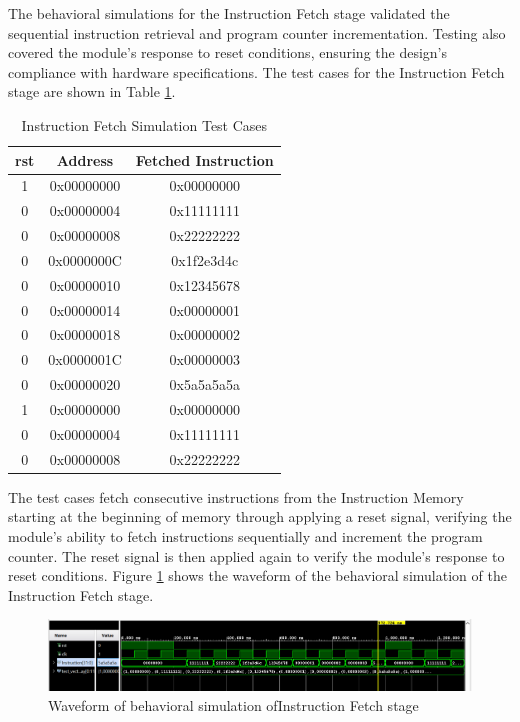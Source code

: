 \documentclass[CMPE]{../KGCOEReport}
\begin{document}
The behavioral simulations for the Instruction Fetch stage validated the sequential instruction retrieval and program counter incrementation. Testing also covered the module's response to reset conditions, ensuring the design's compliance with hardware specifications. The test cases for the Instruction Fetch stage are shown in Table \ref{tab:fetch_test_cases}.

\begin{table}[H]
\centering
\begin{tabular}{|c|c|c|}
\hline
\textbf{rst} & \textbf{Address} & \textbf{Fetched Instruction} \\
\hline
1 & 0x00000000 & 0x00000000 \\
0 & 0x00000004 & 0x11111111 \\
0 & 0x00000008 & 0x22222222 \\
0 & 0x0000000C & 0x1f2e3d4c \\
0 & 0x00000010 & 0x12345678 \\
0 & 0x00000014 & 0x00000001 \\
0 & 0x00000018 & 0x00000002 \\
0 & 0x0000001C & 0x00000003 \\
0 & 0x00000020 & 0x5a5a5a5a \\
1 & 0x00000000 & 0x00000000 \\
0 & 0x00000004 & 0x11111111 \\
0 & 0x00000008 & 0x22222222 \\
\hline
\end{tabular}
\caption{Instruction Fetch Simulation Test Cases}
\label{tab:fetch_test_cases}
\end{table}

The test cases fetch consecutive instructions from the Instruction Memory starting at the beginning of memory through applying a reset signal, verifying the module's ability to fetch instructions sequentially and increment the program counter. The reset signal is then applied again to verify the module's response to reset conditions. Figure \ref{fig:behave_fetch} shows the waveform of the behavioral simulation of the Instruction Fetch stage.

\begin{figure}[H]
    \centering
    \includegraphics[width=1\textwidth]{behave_fetch.png}
    \caption{Waveform of behavioral simulation ofInstruction Fetch stage}
    \label{fig:behave_fetch}
\end{figure}
\end{document}
